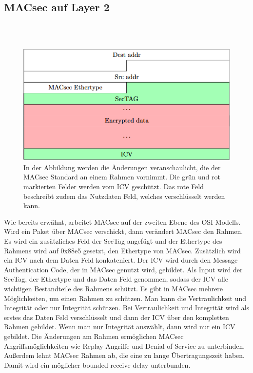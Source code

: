 \subsection{MACsec auf Layer 2} \\
\label{sec:MACsec Layer 2}
\\
\begin{figure}
	\centering
	\includegraphics{images/MACsec_Frame.PNG}
	\caption[MACsec Rahmen]{In der Abbildung werden die Änderungen veranschaulicht, die der MACsec Standard an einem Rahmen vornimmt. Die grün und rot markierten Felder werden vom ICV geschützt. Das rote Feld beschreibt zudem das Nutzdaten Feld, welches verschlüsselt werden kann.}
	\label{img:MACsec_Frame}
\end{figure}Wie bereits erwähnt, arbeitet \gls{MACsec} auf der zweiten Ebene des \gls{OSI-Modell}s. Wird ein Paket über \gls{MACsec} verschickt, dann verändert \gls{MACsec} den Rahmen. Es wird ein zusätzliches Feld der SecTag angefügt und der Ethertype des Rahmens wird auf 0x88e5 gesetzt, den Ethertype von \gls{MACsec}. Zusätzlich wird ein \gls{ICV} nach dem Daten Feld konkateniert. Der \gls{ICV} wird durch den Message Authentication Code, der in \gls{MACsec} genutzt wird, gebildet. Als Input wird der SecTag, der Ethertype und das Daten Feld genommen,  sodass der \gls{ICV} alle wichtigen Bestandteile des Rahmens schützt. Es gibt in \gls{MACsec} mehrere Möglichkeiten, um einen Rahmen zu schützen. Man kann die Vertraulichkeit und Integrität oder nur Integrität schützen. Bei Vertraulichkeit und Integrität wird als erstes das Daten Feld verschlüsselt und dann der \gls{ICV} über den kompletten Rahmen gebildet. Wenn man nur Integrität auswählt, dann wird nur ein \gls{ICV} gebildet.
Die Änderungen am Rahmen ermöglichen \gls{MACsec} Angriffsmöglichkeiten wie Replay Angriffe und Denial of Service zu unterbinden. Außerdem lehnt MACsec Rahmen ab, die eine zu lange Übertragungszeit haben. Damit wird ein möglicher bounded receive delay unterbunden.

